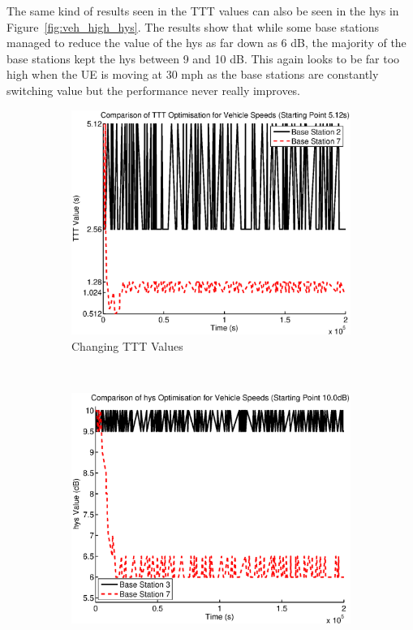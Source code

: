 The same kind of results seen in the TTT values can also be seen in the hys in Figure~\ref{fig:veh_high_hys}. The results show that while some base stations managed to reduce the value of the hys as far down as 6 dB, the majority of the base stations kept the hys between 9 and 10 dB. This again looks to be far too high when the UE is moving at 30 mph as the base stations are constantly switching value but the performance never really improves.
\begin{figure}[H]
        \centering
        \begin{subfigure}[b]{0.49\textwidth}
                \includegraphics[width=\textwidth]{figures/vehicle_figures/high/long_ttt.eps}
                \caption{Changing TTT Values}
                \label{fig:veh_high_ttt}
        \end{subfigure}%
        ~ %
        \begin{subfigure}[b]{0.49\textwidth}
                \includegraphics[width=\textwidth]{figures/vehicle_figures/high/long_hys.eps}

\end{subfigure}
\end{figure}
